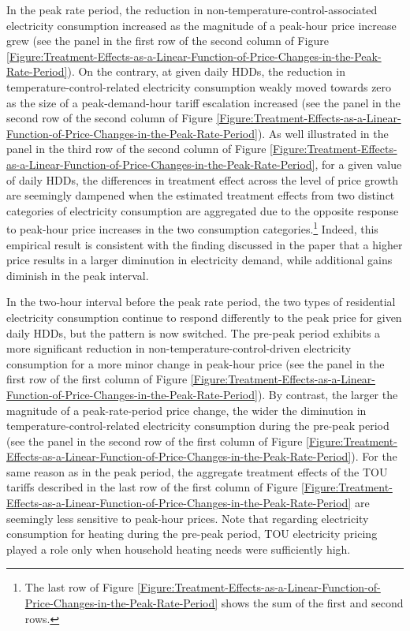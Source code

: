 In the peak rate period, the reduction in non-temperature-control-associated electricity consumption increased as the magnitude of a peak-hour price increase grew (see the panel in the first row of the second column of Figure \ref{Figure:Treatment-Effects-as-a-Linear-Function-of-Price-Changes-in-the-Peak-Rate-Period}). On the contrary, at given daily HDDs, the reduction in temperature-control-related electricity consumption weakly moved towards zero as the size of a peak-demand-hour tariff escalation increased (see the panel in the second row of the second column of Figure \ref{Figure:Treatment-Effects-as-a-Linear-Function-of-Price-Changes-in-the-Peak-Rate-Period}). As well illustrated in the panel in the third row of the second column of Figure \ref{Figure:Treatment-Effects-as-a-Linear-Function-of-Price-Changes-in-the-Peak-Rate-Period}, for a given value of daily HDDs, the differences in treatment effect across the level of price growth are seemingly dampened when the estimated treatment effects from two distinct categories of electricity consumption are aggregated due to the opposite response to peak-hour price increases in the two consumption categories.\footnote{The last row of Figure \ref{Figure:Treatment-Effects-as-a-Linear-Function-of-Price-Changes-in-the-Peak-Rate-Period} shows the sum of the first and second rows.} Indeed, this empirical result is consistent with the finding discussed in the paper that a higher price results in a larger diminution in electricity demand, while additional gains diminish in the peak interval. 

In the two-hour interval before the peak rate period, the two types of residential electricity consumption continue to respond differently to the peak price for given daily HDDs, but the pattern is now switched. The pre-peak period exhibits a more significant reduction in non-temperature-control-driven electricity consumption for a more minor change in peak-hour price (see the panel in the first row of the first column of Figure \ref{Figure:Treatment-Effects-as-a-Linear-Function-of-Price-Changes-in-the-Peak-Rate-Period}). By contrast, the larger the magnitude of a peak-rate-period price change, the wider the diminution in temperature-control-related electricity consumption during the pre-peak period (see the panel in the second row of the first column of Figure \ref{Figure:Treatment-Effects-as-a-Linear-Function-of-Price-Changes-in-the-Peak-Rate-Period}). For the same reason as in the peak period, the aggregate treatment effects of the TOU tariffs described in the last row of the first column of Figure \ref{Figure:Treatment-Effects-as-a-Linear-Function-of-Price-Changes-in-the-Peak-Rate-Period} are seemingly less sensitive to peak-hour prices. Note that regarding electricity consumption for heating during the pre-peak period, TOU electricity pricing played a role only when household heating needs were sufficiently high. 


